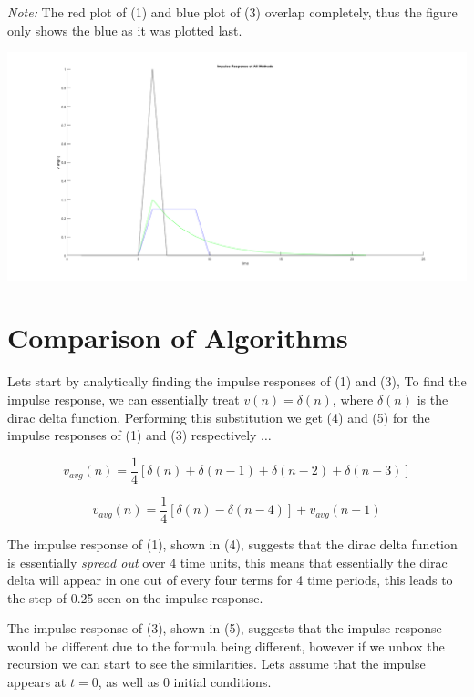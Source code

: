 \documentclass[]{report}
\begin{document}
	\textit{Note:} The red plot of (1) and blue plot of (3) overlap completely, thus the figure only shows the blue as it was plotted last.
	\vspace{1em}
	\begin{center}
		\includegraphics[scale=0.3]{Impulse Responses.png}
	\end{center}
	\vspace{1em}

\section*{Comparison of Algorithms}

	Lets start by analytically finding the impulse responses of (1) and (3), To find the impulse response, we can essentially treat $v(n) = \delta(n)$, where $\delta(n)$ is the dirac delta function. Performing this substitution we get (4) and (5) for the impulse responses of (1) and (3) respectively $\ldots$
	
	\begin{equation}
		v_{avg}(n) = \frac{1}{4} \left[ \delta(n) + \delta(n-1) + \delta(n-2) + \delta(n-3)  \right]
	\end{equation}
	
	\begin{equation}
		v_{avg}(n) = \frac{1}{4} \left[  \delta(n) - \delta(n-4) \right] + v_{avg}(n-1)
	\end{equation}
	
	The impulse response of (1), shown in (4), suggests that the dirac delta function is essentially \textit{spread out} over 4 time units, this means that essentially the dirac delta will appear in one out of every four terms for 4 time periods, this leads to the step of 0.25 seen on the impulse response.
	
	The impulse response of (3), shown in (5), suggests that the impulse response would be different due to the formula being different, however if we unbox the recursion we can start to see the similarities. Lets assume that the impulse appears at $t=0$, as well as 0 initial conditions.
	
\end{document}
